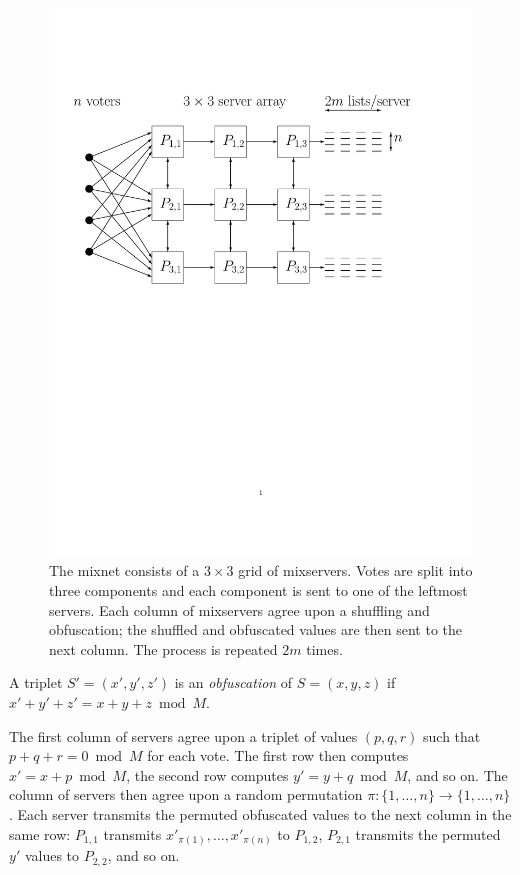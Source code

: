 \begin{figure}[t]
\centering
\includegraphics[width=6in]{mixnet-diagram.pdf}
\caption[The $3 \times 3$ grid of mixservers and the communication among them]{The mixnet consists of a $3 \times 3$ grid of mixservers. Votes are split into three components and each component is sent to one of the leftmost servers. Each column of mixservers agree upon a shuffling and obfuscation; the shuffled and obfuscated values are then sent to the next column. The process is repeated $2m$ times.}
\label{figure:sv:design:mixnet}
\end{figure}

\begin{definition}
A triplet $S' = (x', y', z')$ is an \emph{obfuscation} of $S = (x, y, z)$ if $x'+y'+z' = x+y+z \bmod M$.
\end{definition}

The first column of servers agree upon a triplet of values $(p, q, r)$ such that $p + q + r = 0 \bmod M$ for each vote. The first row then computes $x' = x+p \bmod M$, the second row computes $y' = y+q \bmod M$, and so on. The column of servers then agree upon a random permutation $\pi : \{1, \dotsc, n\} \to \{1, \dotsc, n\}$. Each server transmits the permuted obfuscated values to the next column in the same row: $P_{1,1}$ transmits $x'_{\pi(1)}, \dotsc, x'_{\pi(n)}$ to $P_{1,2}$, $P_{2,1}$ transmits the permuted $y'$ values to $P_{2,2}$, and so on.


